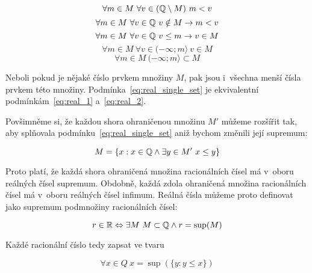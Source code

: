 \begin{equation}
\forall m \in M \ \forall v \in (\mathbb{Q} \setminus M) \ m < v
\end{equation}
\begin{equation}
\forall m \in M \ \forall v \in \mathbb{Q} \ v \notin M \rightarrow m < v
\end{equation}
\begin{equation}
\forall m \in M \ \forall v \in \mathbb{Q} \ v \leq m \rightarrow v \in M
\end{equation}
\begin{equation}
\forall m \in M \ \forall v \in (-\infty; m \rangle \ v \in M
\end{equation}
\begin{equation}
\label{eq:real_single_set}
\forall m \in M \ (-\infty; m \rangle \subset M
\end{equation}

Neboli pokud je nějaké číslo prvkem množiny \(M\), pak jsou i~všechna menší čísla prvkem této množiny. Podmínka~\eqref{eq:real_single_set} je ekvivalentní podmínkám~\eqref{eq:real_1} a~\eqref{eq:real_2}.

Povšimněme si, že každou shora ohraničenou množinu \(M'\) můžeme rozšířit tak, aby splňovala podmínku~\eqref{eq:real_single_set} aniž bychom změnili její supremum:

\begin{equation}
M = \{x: x \in \mathbb{Q} \land \exists y \in M' \ x \leq y\} 
\end{equation}

Proto platí, že každá shora ohraničená množina racionálních čísel má v~oboru reálných čísel supremum. Obdobně, každá zdola ohraničená množina racionálních čísel má v~oboru reálných čísel infimum. Reálná čísla můžeme proto definovat jako supremum podmnožiny racionálních čísel:

\begin{fact}
\begin{equation}
r \in \mathbb{R} \Leftrightarrow \exists M \ M \subset \mathbb{Q} \land r = \sup(M)
\end{equation}
\end{fact}

Každé racionální číslo tedy zapsat ve tvaru

\begin{equation}
\forall x \in Q \ x = \sup(\{y: y \leq x\})
\end{equation}

